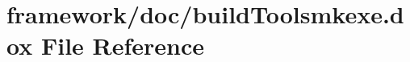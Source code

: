 \hypertarget{build_toolsmkexe_8dox}{}\section{framework/doc/build\+Toolsmkexe.dox File Reference}
\label{build_toolsmkexe_8dox}
